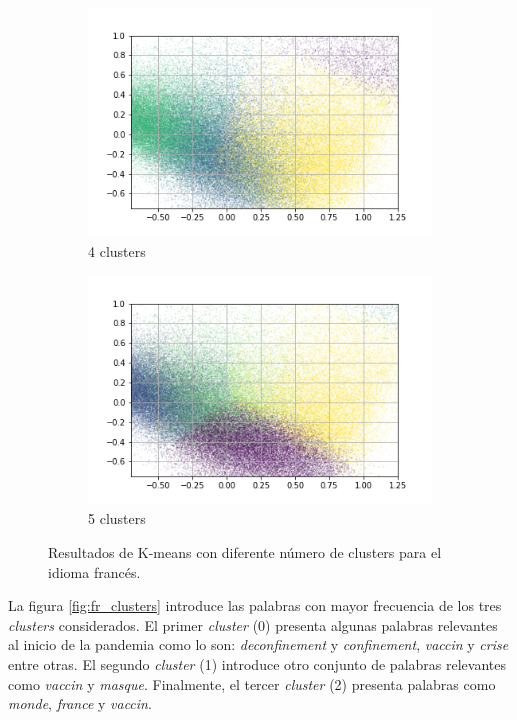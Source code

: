 \begin{figure}
\begin{subfigure}[b]{0.4\textwidth}
         \includegraphics[width=\textwidth]{results/TopicDetection/fr/PCA_4.png}
         \caption{4 clusters}
         \label{fig:fr_kmeans_4}
     \end{subfigure}
     \hfill
     \begin{subfigure}[b]{0.4\textwidth}
         \centering
         \includegraphics[width=\textwidth]{results/TopicDetection/fr/PCA_5.png}
         \caption{5 clusters}
         \label{fig:fr_kmeans_5}
     \end{subfigure}
        \caption{Resultados de K-means con diferente número de clusters para el idioma francés.}
        \label{fig:fr_kmeans}
\end{figure}

La figura \ref{fig:fr_clusters} introduce las palabras con mayor frecuencia de los tres \textit{clusters} considerados. El primer \textit{cluster} (0) presenta algunas palabras relevantes al inicio de la pandemia como lo son: \textit{deconfinement} y \textit{confinement}, \textit{vaccin} y \textit{crise} entre otras. El segundo \textit{cluster} (1) introduce otro conjunto de palabras relevantes como \textit{vaccin} y \textit{masque}. Finalmente, el tercer \textit{cluster} (2) presenta palabras como \textit{monde}, \textit{france} y \textit{vaccin}. 

